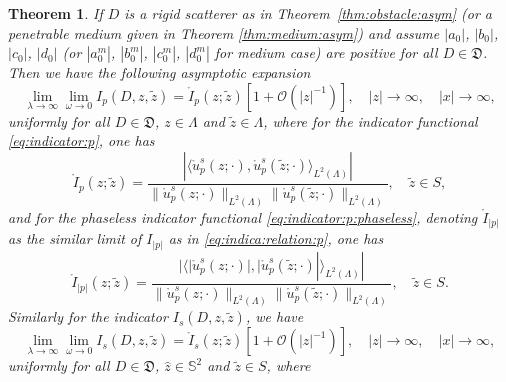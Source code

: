 \documentclass[a4paper,11pt]{article}
\newtheorem{theorem}{Theorem}[section]
\theoremstyle{remark}
\theoremstyle{definition}
\numberwithin{equation}{section}
\begin{document}
\begin{theorem}
If $D$ is a rigid scatterer as in Theorem~\ref{thm:obstacle:asym} (or a penetrable medium given in Theorem \ref{thm:medium:asym}) and assume $|a_0|$, $|b_0|$, $|c_0|$, $|d_0|$ (or $|a^m_0|$, $|b^m_0|$, $|c^m_0|$, $|d^m_0|$ for medium case) are positive for all $D \in \mathfrak{D}$. Then we have the following asymptotic expansion
\begin{equation}\label{eq:indica:relation:p}
\lim_{\lambda \rightarrow \infty}\lim_{\omega \rightarrow 0} I_{p}(D,z, \tilde{z}) = \mathring{I}_{p}(z;\tilde{z})[1+ \mathcal{O}(|z|^{-1})], \quad |z|\rightarrow \infty, \quad |x| \rightarrow \infty,
\end{equation}
uniformly for all $D \in \mathfrak{D}$, $z \in \Lambda$ and $\tilde{z} \in \Lambda$, where for the indicator functional \eqref{eq:indicator:p}, one has
\begin{equation}
 \mathring{I}_{p}(z;\tilde{z})  = \frac{|\langle \mathring{u}_{p}^s(z;\cdot), \mathring{u}_{p}^s(\tilde{z};\cdot)  \rangle_{L^2(\Lambda)} |}{\|\mathring{u}_{p}^s({z};\cdot)\|_{L^2(\Lambda)} \|\mathring{u}_{p}^s(\tilde{z};\cdot)\|_{L^2(\Lambda)} }, \quad \tilde{z} \in S,
\end{equation}
and for the phaseless indicator functional \eqref{eq:indicator:p:phaseless}, denoting $ \mathring{I}_{|p|}$ as the similar limit of $I_{|p|}$ as in \eqref{eq:indica:relation:p}, one has
\begin{equation}
 \mathring{I}_{|p|}(z;\tilde{z})  = \frac{|\langle |\mathring{u}_{p}^s(z;\cdot)|, |\mathring{u}_{p}^s(\tilde{z};\cdot) | \rangle_{L^2(\Lambda)} |}{\|\mathring{u}_{p}^s({z};\cdot) \|_{L^2(\Lambda)}\|\mathring{u}_{p}^s(\tilde{z};\cdot)\|_{L^2(\Lambda)} }, \quad \tilde{z} \in S.
\end{equation}
Similarly for the indicator $I_{s}(D,z, \tilde{z})$, we have
\begin{equation}\label{eq:indica:relation:s}
\lim_{\lambda \rightarrow \infty}\lim_{\omega \rightarrow 0} I_{s}(D,z, \tilde{z}) = \mathring{I}_{s}(z;\tilde{z})[1+ \mathcal{O}(|z|^{-1})], \quad |z|\rightarrow \infty, \quad |x| \rightarrow \infty,
\end{equation}
uniformly for all $D \in \mathfrak{D}$, $\hat{z}\in \mathbb{S}^2$ and $\tilde{z} \in S$, where


\end{theorem}
\end{document}
